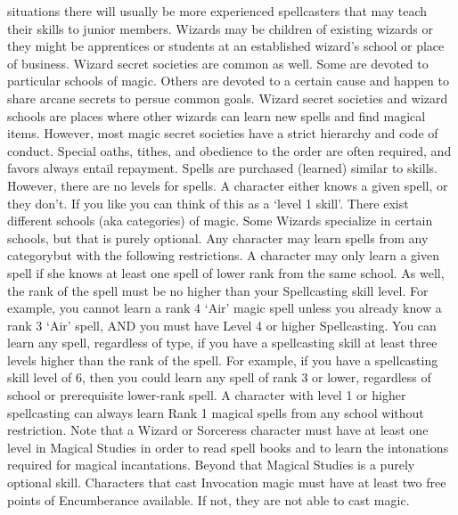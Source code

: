 \documentclass[twoside]{book}
\begin{document}
               situations there will usually be more experienced
               spellcasters that may teach their skills to junior
               members. Wizards may be children of existing wizards or
               they might be apprentices or students at an established
               wizard's school or place of business. Wizard secret
               societies are common as well. Some are devoted to
               particular schools of magic. Others are devoted to a
               certain cause and happen to share arcane secrets to persue
               common goals. Wizard secret societies and wizard schools
               are places where other wizards can learn new spells and
               find magical items. However, most magic secret societies
               have a strict hierarchy and code of conduct. Special
               oaths, tithes, and obedience to the order are often
               required, and favors always entail repayment.   Spells are purchased (learned) similar to skills.
               However, there are no levels for spells. A character
               either knows a given spell, or they don't. If you
               like you can think of this as a `level 1
               skill'.   There exist different schools (aka categories) of
               magic. Some Wizards specialize in certain schools, but
               that is purely optional. Any character may learn spells
               from any categorybut with the following
               restrictions. A character may only learn a given spell if
               she knows at least one spell of lower rank from the same
               school. As well, the rank of the spell must be no higher
               than your Spellcasting skill level. For example, you
               cannot learn a rank 4 `Air' magic spell unless
               you already know a rank 3 `Air' spell, AND you
               must have Level 4 or higher Spellcasting.   You can learn any spell, regardless of type, if you
               have a spellcasting skill at least three levels higher
               than the rank of the spell. For example, if you have a
               spellcasting skill level of 6, then you could learn any
               spell of rank 3 or lower, regardless of school or
               prerequisite lower-rank spell.   A character with level 1 or higher spellcasting can
               always learn Rank 1 magical spells from any school without
               restriction.   Note that a Wizard or Sorceress character must have
               at least one level in Magical Studies in order to read
               spell books and to learn the intonations required for
               magical incantations. Beyond that Magical Studies is a
               purely optional skill.   Characters that cast Invocation magic must have at
               least two free points of Encumberance available. If not,
               they are not able to cast magic. 
    
\end{document}

